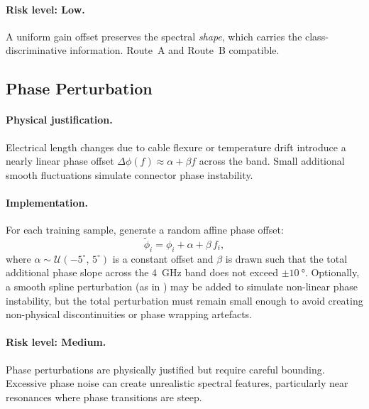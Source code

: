 \paragraph{Risk level: \textbf{Low}.}
A uniform gain offset preserves the spectral \emph{shape}, which
carries the class-discriminative information.  Route~A and Route~B
compatible.

\subsection{Phase Perturbation}
\label{sec:augment:phase}

\paragraph{Physical justification.}
Electrical length changes due to cable flexure or temperature drift
introduce a nearly linear phase offset
$\Delta\phi(f) \approx \alpha + \beta f$ across the band.
Small additional smooth fluctuations simulate connector phase
instability.

\paragraph{Implementation.}
For each training sample, generate a random affine phase offset:
\begin{equation}
  \tilde{\phi}_i = \phi_i + \alpha + \beta\, f_i,
  \label{eq:phase_perturb}
\end{equation}
where $\alpha \sim \mathcal{U}(-5^{\circ},\,5^{\circ})$ is a constant
offset and $\beta$ is drawn such that the total additional phase slope
across the \SI{4}{\giga\hertz} band does not exceed
$\pm\SI{10}{\degree}$.  Optionally, a smooth spline perturbation
(as in ) may be added to simulate non-linear
phase instability, but the total perturbation must remain small enough
to avoid creating non-physical discontinuities or phase wrapping
artefacts.

\paragraph{Risk level: \textbf{Medium}.}
Phase perturbations are physically justified but require careful
bounding.  Excessive phase noise can create unrealistic spectral
features, particularly near resonances where phase transitions are
steep.

